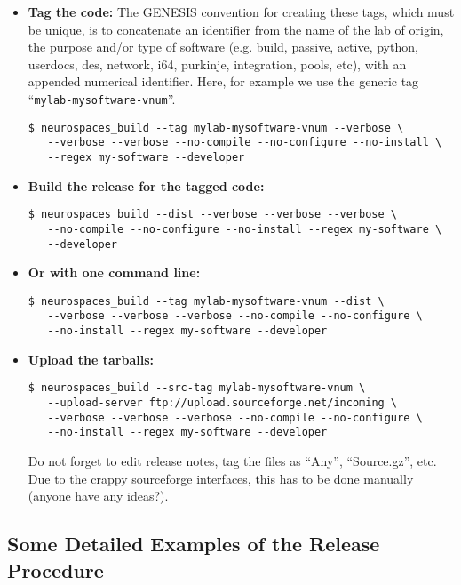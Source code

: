 \documentclass[12pt]{article}
\begin{document}
\begin{itemize}

\item {\bf Tag the code:} The GENESIS convention for creating these tags, which must be unique, is to concatenate an identifier from the name of the lab of origin, the purpose and/or type of software (e.g. build, passive, active, python, userdocs, des, network, i64, purkinje, integration, pools, etc), with an appended numerical identifier. Here, for example we use the generic tag ``{\tt mylab-mysoftware-vnum}''.
\begin{verbatim}
$ neurospaces_build --tag mylab-mysoftware-vnum --verbose \
   --verbose --verbose --no-compile --no-configure --no-install \
   --regex my-software --developer
\end{verbatim}

\item {\bf Build the release for the tagged code:}
\begin{verbatim}
$ neurospaces_build --dist --verbose --verbose --verbose \
   --no-compile --no-configure --no-install --regex my-software \
   --developer
\end{verbatim}

\item {\bf Or with one command line:}
\begin{verbatim}
$ neurospaces_build --tag mylab-mysoftware-vnum --dist \
   --verbose --verbose --verbose --no-compile --no-configure \
   --no-install --regex my-software --developer
\end{verbatim}

\item {\bf Upload the tarballs:}
\begin{verbatim}
$ neurospaces_build --src-tag mylab-mysoftware-vnum \
   --upload-server ftp://upload.sourceforge.net/incoming \
   --verbose --verbose --verbose --no-compile --no-configure \
   --no-install --regex my-software --developer
\end{verbatim}
Do not forget to edit release notes, tag the files as ``Any'', ``Source.gz'', etc. Due to the crappy sourceforge interfaces, this has to be done manually (anyone have any ideas?).

\end{itemize}


\subsection*{Some Detailed Examples of the Release Procedure}
\end{document}
